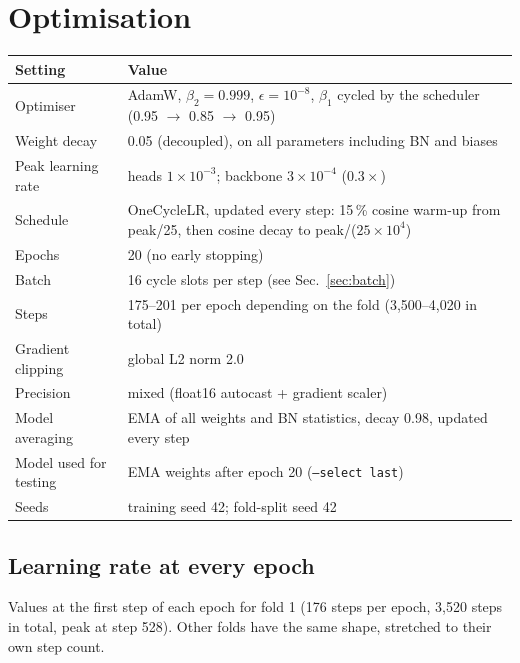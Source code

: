 \documentclass[10pt,a4paper]{article}
\begin{document}
\section{Optimisation}

\begin{center}
\begin{tabularx}{\textwidth}{@{}lL@{}}
\toprule
Setting & Value \\
\midrule
Optimiser & AdamW, $\beta_2 = 0.999$, $\epsilon = 10^{-8}$, $\beta_1$ cycled by the scheduler (0.95 $\to$ 0.85 $\to$ 0.95) \\
Weight decay & 0.05 (decoupled), on all parameters including BN and biases \\
Peak learning rate & heads $1\times10^{-3}$; backbone $3\times10^{-4}$ ($0.3\times$) \\
Schedule & OneCycleLR, updated every step: 15\,\% cosine warm-up from peak/25, then cosine
  decay to peak/($25\times10^4$) \\
Epochs & 20 (no early stopping) \\
Batch & 16 cycle slots per step (see Sec.~\ref{sec:batch}) \\
Steps & 175--201 per epoch depending on the fold (3{,}500--4{,}020 in total) \\
Gradient clipping & global L2 norm 2.0 \\
Precision & mixed (float16 autocast + gradient scaler) \\
Model averaging & EMA of all weights and BN statistics, decay 0.98, updated every step \\
Model used for testing & EMA weights after epoch 20 (\texttt{--select last}) \\
Seeds & training seed 42; fold-split seed 42 \\
\bottomrule
\end{tabularx}
\end{center}

\subsection{Learning rate at every epoch}
Values at the first step of each epoch for fold 1 (176 steps per epoch, 3{,}520 steps in total,
peak at step 528). Other folds have the same shape, stretched to their own step count.
\end{document}
